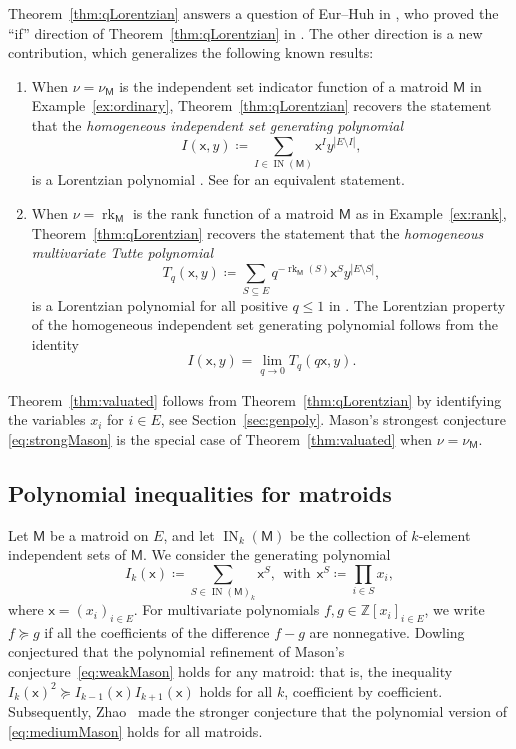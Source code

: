 \documentclass{amsart}
\theoremstyle{definition}
\theoremstyle{remark}
\newcommand{\abs}[1]{\left|#1\right|}               %
\newcommand{\Z}{\mathbb{Z}}
\newcommand{\M}{\mathsf{M}}    %
\newcommand{\x}{\mathsf{x}}    %
\DeclareMathOperator{\rk}{rk}       %
\DeclareMathOperator{\IN}{{IN}}
\newcommand{\1}{\mathbf{1}}
\numberwithin{equation}{section}
\begin{document}
Theorem~\ref{thm:qLorentzian} answers a question of Eur--Huh in \cite[Section 5]{EH20}, who proved the ``if'' direction of Theorem~\ref{thm:qLorentzian} in \cite[Proposition 5.5]{EH20}. 
The other direction is a new contribution, which generalizes the following known results:
        \begin{enumerate}[(1)]\itemsep 5pt
            \item When $\nu=\nu_\M$ is the independent set indicator function of a matroid $\M$ in Example~\ref{ex:ordinary}, Theorem~\ref{thm:qLorentzian} recovers the statement that the \emph{homogeneous independent set generating polynomial}
            \[
            I(\x,y) \coloneqq \sum\limits_{I\in \IN(\M)} \x^I y^{\abs{E \setminus I}},
            \]
            is a Lorentzian polynomial \cite[Section 4.3]{BH20}. See \cite[Theorem 4.1]{ALOVIII} for an equivalent statement. 
            \item When $\nu=\rk_\M$ is the rank function of a matroid $\M$ as in Example~\ref{ex:rank}, Theorem~\ref{thm:qLorentzian} recovers the statement that the \emph{homogeneous multivariate Tutte polynomial} 
            \[
            T_{q}(\x,y)\coloneqq \sum\limits_{S\subseteq E} q^{-\rk_\M(S)} \x^S y^{\abs{E \setminus S}},
            \]
            is a Lorentzian polynomial for all positive $q \le 1$ in  \cite[Theorem 4.10]{BH20}. The Lorentzian property of the homogeneous independent set generating polynomial follows from the identity 
            \[
            I(\x,y)=\lim_{q \to 0} T_{q}(q \x,y).
            \]
        \end{enumerate}
Theorem~\ref{thm:valuated} follows from Theorem~\ref{thm:qLorentzian} by identifying the variables $x_i$ for $i \in E$, see Section~\ref{sec:genpoly}.
Mason's strongest conjecture \eqref{eq:strongMason} is the special case of Theorem~\ref{thm:valuated}  when $\nu=\nu_\M$.

\subsection{Polynomial inequalities for matroids}
Let $\M$ be a matroid on $E$, and let $\IN_k(\M)$ be the collection of $k$-element independent sets of $\M$. We consider the generating polynomial
\[
	I_k(\x)\coloneqq\sum_{S\in\IN(\M)_k} \x^S, \ \ \text{with} \ \  \x^S \coloneqq \prod_{i \in S} x_i,
    \]
where $\x=(x_i)_{i\in E}$. 
 For multivariate polynomials
$f,g\in \Z[x_i]_{i \in E}$, we write $f\succeq g$ if all the coefficients of the difference $f-g$ are nonnegative.
 Dowling~\cite[Section 2]{Do80} conjectured that the polynomial refinement of Mason's conjecture~\eqref{eq:weakMason} holds for any matroid: that is, the inequality $ I_k(\x)^2 \succeq I_{k-1}(\x) I_{k+1}(\x)$ holds for all $k$, coefficient by coefficient.  Subsequently, Zhao~\cite{Zh85} made the stronger conjecture that the polynomial version of \eqref{eq:mediumMason} holds for all matroids.
\end{document}
